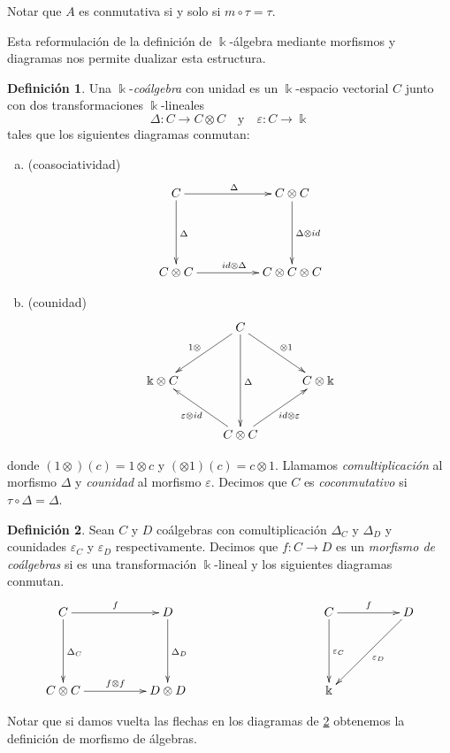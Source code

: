 \documentclass[a4paper,oneside,fleqn,11pt]{report}
\newcommand\ox{\otimes}
\newcommand\field{\Bbbk}
\newcommand{\veps}{\varepsilon}
\theoremstyle{definition}
\newtheorem{definition}{Definición}[section]
\theoremstyle{definition}
\numberwithin{prop}{subsection}
\begin{document}
Notar que $A$ es conmutativa si y solo si $m \circ \tau = \tau$.

Esta reformulación de la definición de $\field$-álgebra mediante morfismos y diagramas nos permite dualizar esta estructura.

\begin{definition}\label{defcoalgebra}
	Una $\field$-\emph{coálgebra} con unidad es un $\field$-espacio vectorial $C$
	junto con dos transformaciones $\field$-lineales
	\[
		\Delta: C \to C \ox C \quad\text{y}\quad \varepsilon: C \to \field
	\]
	tales que los siguientes diagramas conmutan:
	\begin{enumerate}[(a)]
		\item (coasociatividad)
		\begin{align*}
		\xymatrix@=5em{
			C \ar[r]^{\Delta} \ar[d]^{\Delta} & C \ox C \ar[d]^{\Delta \ox id}\\
			C \ox C \ar[r]^{id \ox \Delta} & C \ox C \ox C
		}
		\end{align*}
		\item (counidad)
		\begin{align*}
		\xymatrix@=3em{
			& C \ar[dd]^{\Delta} \ar[dl]_{1\ox} \ar[dr]^{\ox 1} & \\
			\field \ox C  & & C \ox \field \\
			& C \ox C \ar[ul]^{\veps \ox id} \ar[ur]_{id \ox \veps} &
		}
		\end{align*}
	\end{enumerate}
	donde $(1 \ox) (c) = 1 \ox c$ y $(\ox 1)(c) = c \ox 1$. Llamamos \emph{comultiplicación} al morfismo $\Delta$
	y \emph{counidad} al morfismo $\veps$.
	Decimos que $C$ es \emph{coconmutativo} si $\tau \circ \Delta = \Delta$.
\end{definition}

\begin{definition} \label{defmorfcoalegbras}
	Sean $C$ y $D$ coálgebras con comultiplicación $\Delta_C$ y $\Delta_D$ y counidades $\veps_C$ y $\veps_D$ respectivamente.
	Decimos que $f:C \to D$ es un \emph{morfismo de coálgebras} si es una transformación $\field$-lineal y los siguientes diagramas
	conmutan.
	\begin{align*}
	\xymatrix@=5em{
		C \ar[r]^{f} \ar[d]^{\Delta_C} & D \ar[d]^{\Delta_D} && C \ar[r]^{f} \ar[d]^{\veps_C} & D \ar[dl]^{\veps_D} \\
		C \ox C \ar[r]^{f \ox f} & D\ox D && \field	
	}
	\end{align*}
\end{definition}
Notar que si damos vuelta las flechas en los diagramas de \ref{defmorfcoalegbras} obtenemos la definición de morfismo de álgebras.
\end{document}
